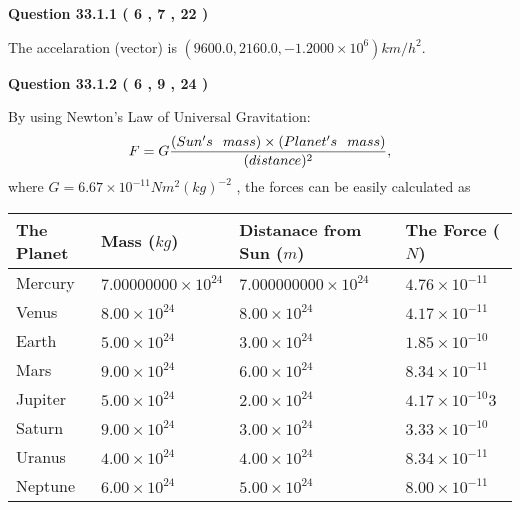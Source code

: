 \documentclass[12pt]{article}
\begin{document}
\vspace{0.2in}
  
{\textbf{\Large{Question
33.1.1 
 (           6 ,           7 ,          22 )
}}}
  
  
 
 
\noindent{}
 
 
The accelaration (vector) is
$(
9600.0,
2160.0 ,
-1.2000 \times 10^{6}
)km/h^2.
$
 
 
 
 
  
\vspace{0.2in}
  
{\textbf{\Large{Question
33.1.2 
 (           6 ,           9 ,          24 )
}}}
  
  
 
 
\noindent{}

By using Newton's Law of Universal Gravitation:
\[
F=G \frac{(Sun's \hspace{0.1in} mass) \times (Planet's \hspace{0.1in} mass)} { (distance)^2},
\]
where
$ G= %
6.67 \times 10^{-11} N m^{2}(kg)^{-2}$ , the forces can be easily calculated as
 
\vspace{0.2in}
 
 
\begin{tabular}{|l|l|l|l|}
\hline
The Planet & Mass ($kg$) & Distanace from Sun ($m$) & The Force ($N$)\\
\hline
Mercury  &
           $ %
7.00000000 \times 10^{24}  $   &
             $ %
7.000000000 \times 10^{24}$    & $ %
4.76 \times 10^{-11} $
\\  \hline
Venus    &
           $  %
8.00 \times 10^{24}  $     &
             $ %
8.00 \times 10^{24} $    & $ %
4.17 \times 10^{-11} $
\\  \hline
Earth    &
           $  %
5.00 \times 10^{24}$     &
             $ %
3.00 \times 10^{24} $    & $ %
1.85 \times 10^{-10} $
\\   \hline
Mars     &
           $  %
9.00 \times 10^{24} $     &
             $ %
6.00 \times 10^{24}$    & $ %
8.34 \times 10^{-11} $
\\   \hline
Jupiter  &
           $  %
5.00 \times 10^{24}  $    &
             $ %
2.00 \times 10^{24} $    & $ %
4.17 \times 10^{-10}3 $
\\  \hline
Saturn   &
           $  %
9.00 \times 10^{24}   $    &
             $ %
3.00 \times 10^{24}  $    & $ %
3.33 \times 10^{-10} $
\\  \hline
Uranus   &
           $  %
4.00 \times 10^{24} $    &
             $ %
4.00 \times 10^{24}$    & $ %
8.34 \times 10^{-11} $
\\  \hline
Neptune  &
           $  %
6.00 \times 10^{24}  $    &
             $ %
5.00 \times 10^{24} $    & $ %
8.00 \times 10^{-11} $
\\  \hline
 
\end{tabular}
 
\end{document}
